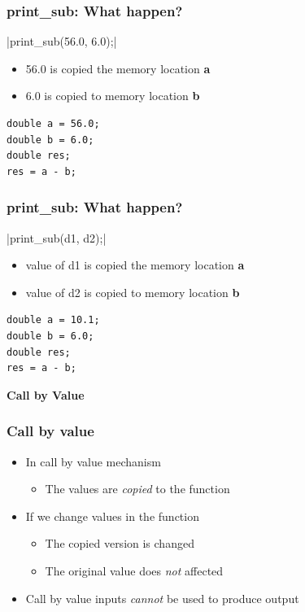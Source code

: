 \documentclass{../c-lecture}
\begin{document}
\begin{frame}[fragile]
  \frametitle{print\_sub: What happen?}
  |print_sub(56.0, 6.0);|
  \begin{itemize}
    \item 56.0 is copied the memory location \textbf{\color{LimeGreen} a}
    \item 6.0 is copied to memory location \textbf{\color{Orange} b}
  \end{itemize}
  \begin{verbatim}
double a = 56.0;
double b = 6.0;
double res;
res = a - b;
  \end{verbatim}
\end{frame}

\begin{frame}[fragile]
  \frametitle{print\_sub: What happen?}
  |print_sub(d1, d2);|
  \begin{itemize}
    \item
      value of d1 is copied the memory location
      \textbf{\color{LimeGreen} a}
    \item
      value of d2 is copied to memory location
      \textbf{\color{YellowOrange} b}
  \end{itemize}
  \begin{verbatim}
double a = 10.1;
double b = 6.0;
double res;
res = a - b;
  \end{verbatim}
  \pause
  \textbf{\color{RubineRed} Call by Value}
\end{frame}

\begin{frame}
  \frametitle{Call by value}
  \begin{itemize}
    \item In call by value mechanism
    \begin{itemize}
      \item
        The values are \textit{\color{Orange} copied} to the function
    \end{itemize}
    \item If we change values in the function
    \begin{itemize}
      \item The copied version is changed
      \item
        The original value does \textit{\color{RubineRed} not} affected
    \end{itemize}
    \item
      Call by value inputs \textit{\color{RubineRed} cannot} be used to
      produce output
  \end{itemize}
\end{frame}
\end{document}
